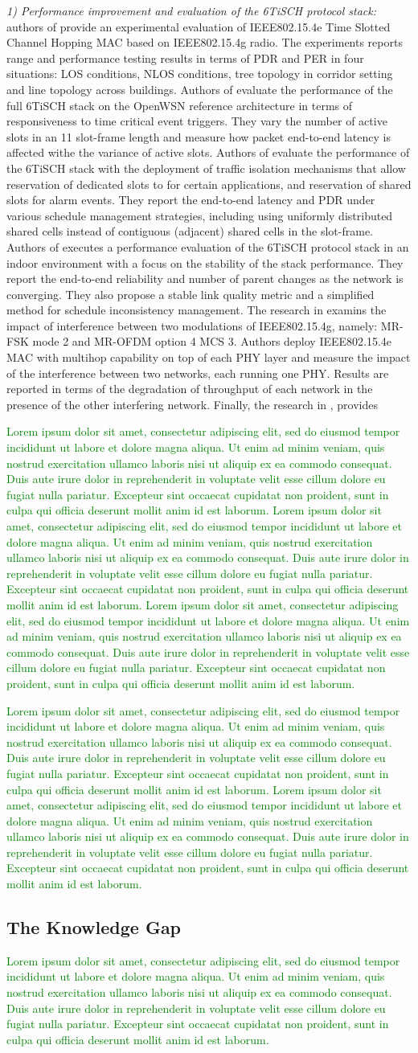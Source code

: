 \documentclass[journal]{IEEEtran}
\newcommand{\lorem}        {\textcolor{green}{Lorem ipsum dolor sit amet, consectetur adipiscing elit, sed do eiusmod tempor incididunt ut labore et dolore magna aliqua. Ut enim ad minim veniam, quis nostrud exercitation ullamco laboris nisi ut aliquip ex ea commodo consequat. Duis aute irure dolor in reprehenderit in voluptate velit esse cillum dolore eu fugiat nulla pariatur. Excepteur sint occaecat cupidatat non proident, sunt in culpa qui officia deserunt mollit anim id est laborum.}}
\begin{document}
\textit{1) Performance improvement and evaluation of the 6TiSCH protocol stack:} authors of \cite{sum17experimental} provide an experimental evaluation of IEEE802.15.4e Time Slotted Channel Hopping MAC based on IEEE802.15.4g radio.
The experiments reports range and performance testing results in terms of PDR and PER in four situations: LOS conditions, NLOS conditions, tree topology in corridor setting and line topology across buildings.
Authors of \cite{yang18analysis} evaluate the performance of the full 6TiSCH stack on the OpenWSN reference architecture in terms of responsiveness to time critical event triggers.
They vary the number of active slots in an 11 slot-frame length and measure how packet end-to-end latency is affected withe the variance of active slots. 
Authors of \cite{theoleyre16experimental} evaluate the performance of the 6TiSCH stack with the deployment of traffic isolation mechanisms that allow reservation of dedicated slots to for certain applications, and reservation of shared slots for alarm events.
They report the end-to-end latency and PDR under various schedule management strategies, including using uniformly distributed shared cells instead of contiguous (adjacent) shared cells in the slot-frame.
Authors of \cite{teleshermeto18reactions} executes a performance evaluation of the 6TiSCH protocol stack in an indoor environment with a focus on the stability of the stack performance.
They report the end-to-end reliability and number of parent changes as the network is converging.
They also propose a stable link quality metric and a simplified method for schedule inconsistency management.
The research in \cite{kojima15system} examins the impact of interference between two modulations of IEEE802.15.4g, namely: MR-FSK mode 2 and MR-OFDM option 4 MCS 3. 
Authors deploy IEEE802.15.4e MAC with multihop capability on top of each PHY layer and measure the impact of the interference between two networks, each running one PHY.
Results are reported in terms of the degradation of throughput of each network in the presence of the other interfering network. 
Finally, the research in \cite{benyaala16performance}, provides 

\cite{munoz18evaluationa}
\lorem
\cite{sum17experimental}
\lorem
\cite{munoz18overview}
\lorem

%
\lorem
\cite{lemic19locationbased}
\lorem
\cite{brachmann19ieee}


\subsection{The Knowledge Gap}
\lorem
\end{document}
